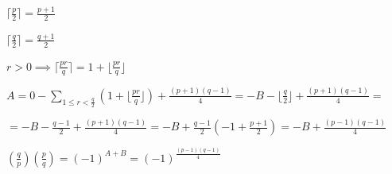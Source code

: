 \documentclass{article}
\begin{document}
\( \lceil{\frac{p}{2}}\rceil = \frac{p+1}{2} \)

\( \lceil{\frac{q}{2}}\rceil = \frac{q+1}{2} \)

\( r > 0 \implies \lceil\frac{pr}{q}\rceil = 1 + \lfloor\frac{pr}{q}\rfloor \)

\( A = 0 - \sum_{1\leq r < \frac{q}{2}} (1 + \lfloor\frac{pr}{q}\rfloor) + \frac{(p+1)(q-1)}{4} = -B - \lfloor{\frac{q}{2}}\rfloor + \frac{(p+1)(q-1)}{4} = \)

\( = -B - \frac{q-1}{2} + \frac{(p+1)(q-1)}{4} = -B + \frac{q-1}{2}(-1 + \frac{p+1}{2}) = - B + \frac{(p-1)(q-1)}{4} \)

\( (\frac{q}{p})(\frac{p}{q}) = (-1)^{A+B} = (-1)^{\frac{(p-1)(q-1)}{4}} \)
\end{document}
